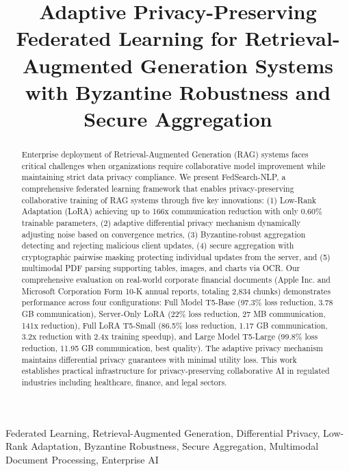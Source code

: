 \documentclass[conference]{IEEEtran}
\begin{document}
\title{Adaptive Privacy-Preserving Federated Learning for Retrieval-Augmented Generation Systems with Byzantine Robustness and Secure Aggregation}

\author{
}

\maketitle

\begin{abstract}
Enterprise deployment of Retrieval-Augmented Generation (RAG) systems faces critical challenges when organizations require collaborative model improvement while maintaining strict data privacy compliance. We present FedSearch-NLP, a comprehensive federated learning framework that enables privacy-preserving collaborative training of RAG systems through five key innovations: (1) Low-Rank Adaptation (LoRA) achieving up to 166x communication reduction with only 0.60\% trainable parameters, (2) adaptive differential privacy mechanism dynamically adjusting noise based on convergence metrics, (3) Byzantine-robust aggregation detecting and rejecting malicious client updates, (4) secure aggregation with cryptographic pairwise masking protecting individual updates from the server, and (5) multimodal PDF parsing supporting tables, images, and charts via OCR. Our comprehensive evaluation on real-world corporate financial documents (Apple Inc. and Microsoft Corporation Form 10-K annual reports, totaling 2,834 chunks) demonstrates performance across four configurations: Full Model T5-Base (97.3\% loss reduction, 3.78 GB communication), Server-Only LoRA (22\% loss reduction, 27 MB communication, 141x reduction), Full LoRA T5-Small (86.5\% loss reduction, 1.17 GB communication, 3.2x reduction with 2.4x training speedup), and Large Model T5-Large (99.8\% loss reduction, 11.95 GB communication, best quality). The adaptive privacy mechanism maintains differential privacy guarantees with minimal utility loss. This work establishes practical infrastructure for privacy-preserving collaborative AI in regulated industries including healthcare, finance, and legal sectors.
\end{abstract}

\begin{IEEEkeywords}
Federated Learning, Retrieval-Augmented Generation, Differential Privacy, Low-Rank Adaptation, Byzantine Robustness, Secure Aggregation, Multimodal Document Processing, Enterprise AI
\end{IEEEkeywords}
\end{document}
